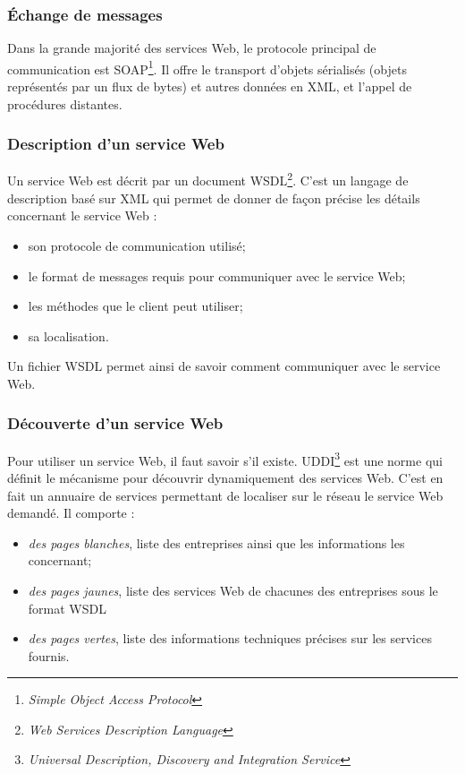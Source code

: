 \subsubsection{\'Echange de messages}

Dans la grande majorit\'e des services Web, le protocole principal de communication est SOAP\protect\footnote{\textit{Simple Object Access Protocol}}.
Il offre le transport d'objets s\'erialis\'es (objets repr\'esent\'es par un flux de bytes) et autres donn\'ees en XML, et l'appel de proc\'edures distantes.

\subsubsection{Description d'un service Web}

Un service Web est d\'ecrit par un document WSDL\protect\footnote{\textit{Web Services Description Language}}.
C'est un langage de description bas\'e sur XML qui permet de donner de fa\c{c}on pr\'ecise les d\'etails concernant le service Web :

\begin{itemize}
	\item son protocole de communication utilis\'e;
	\item le format de messages requis pour communiquer avec le service Web;
	\item les m\'ethodes que le client peut utiliser;
	\item sa localisation.

\end{itemize}

\vspace{0.20cm}

\noindent Un fichier WSDL permet ainsi de savoir comment communiquer avec le service Web.

\subsubsection{D\'ecouverte d'un service Web}

Pour utiliser un service Web, il faut savoir s'il existe.
UDDI\protect\footnote{\textit{Universal Description, Discovery and Integration Service}} est une norme qui d\'efinit le m\'ecanisme pour d\'ecouvrir dynamiquement des services Web.
C'est en fait un annuaire de services permettant de localiser sur le r\'eseau le service Web demand\'e.
\noindent Il comporte :

\begin{itemize}
	\item \textit{des pages blanches}, liste des entreprises ainsi que les informations les concernant;
	\item \textit{des pages jaunes}, liste des services Web de chacunes des entreprises sous le format WSDL
	\item \textit{des pages vertes}, liste des informations techniques pr\'ecises sur les services fournis.

\end{itemize}


